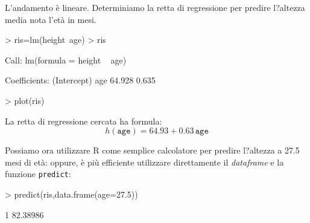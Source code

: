 \documentclass[onecolumn,11pt]{book}
\begin{document}
L'andamento \`e lineare. Determiniamo la retta di regressione 
per predire l?altezza media nota l'et\`a in mesi. 
\begin{Schunk}
\begin{Sinput}
> ris=lm(height~age) 
> ris
\end{Sinput}
\begin{Soutput}
Call:
lm(formula = height ~ age)

Coefficients:
(Intercept)          age  
     64.928        0.635  
\end{Soutput}
\begin{Sinput}
> plot(ris)
\end{Sinput}
\end{Schunk}

La retta di regressione cercata ha formula:
$$h(\texttt{age})=64.93+ 0.63\, \texttt{age}$$

Possiamo ora utilizzare \textsf{R} come semplice calcolatore per predire l?altezza a 27.5 mesi di et\`a:
oppure, \`e pi\`u  efficiente utilizzare direttamente il \emph{dataframe} e la funzione  
\texttt{predict}:
\begin{Schunk}
\begin{Sinput}
> predict(ris,data.frame(age=27.5))
\end{Sinput}
\begin{Soutput}
       1 
82.38986 
\end{Soutput}
\end{Schunk}
 
\end{document}
